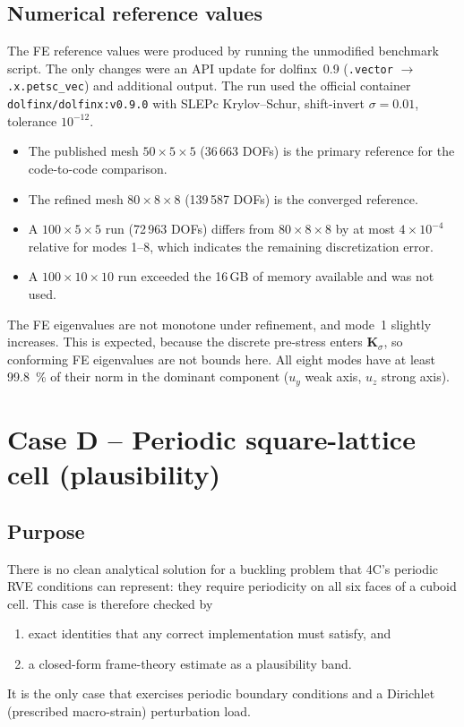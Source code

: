 \documentclass[11pt,a4paper]{report}
\newcommand{\K}{\mathbf{K}}
\begin{document}
\section{Numerical reference values}
The FE reference values were produced by running the unmodified benchmark
script. The only changes were an API update for dolfinx~0.9 (\texttt{.vector}
$\to$ \texttt{.x.petsc\_vec}) and additional output. The run used the
official container \texttt{dolfinx/dolfinx:v0.9.0} with SLEPc Krylov--Schur,
shift-invert $\sigma=0.01$, tolerance $10^{-12}$.
\begin{itemize}
\item The published mesh $50\times5\times5$ (36\,663 DOFs) is the primary
  reference for the code-to-code comparison.
\item The refined mesh $80\times8\times8$ (139\,587 DOFs) is the converged
  reference.
\item A $100\times5\times5$ run (72\,963 DOFs) differs from $80\times8\times8$
  by at most $4\times10^{-4}$ relative for modes 1--8, which indicates the
  remaining discretization error.
\item A $100\times10\times10$ run exceeded the 16\,GB of memory available and
  was not used.
\end{itemize}
The FE eigenvalues are not monotone under refinement, and mode~1 slightly
increases. This is expected, because the discrete pre-stress enters
$\K_\sigma$, so conforming FE eigenvalues are not bounds here. All eight
modes have at least \SI{99.8}{\percent} of their norm in the dominant
component ($u_y$ weak axis, $u_z$ strong axis).

\chapter{Case D -- Periodic square-lattice cell (plausibility)}
\label{ch:periodic}

\section{Purpose}
There is no clean analytical solution for a buckling problem that 4C's
periodic RVE conditions can represent: they require periodicity on all six
faces of a cuboid cell. This case is therefore checked by
\begin{enumerate}
\item exact identities that any correct implementation must satisfy, and
\item a closed-form frame-theory estimate as a plausibility band.
\end{enumerate}
It is the only case that exercises periodic boundary conditions and a
Dirichlet (prescribed macro-strain) perturbation load.
\end{document}
